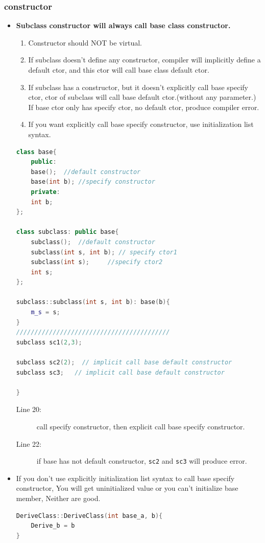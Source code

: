\documentclass[a4paper,11pt,twoside]{book}
\begin{document}
\subsubsection{constructor}
\begin{itemize}
	\item  \textbf{Subclass constructor will always call base class constructor.}
	
	\begin{enumerate}
		\item Constructor should NOT be virtual.
		
		\item If subclass doesn't define any constructor, compiler will implicitly define a default ctor, and this ctor will call base class default ctor.
		
		\item If subclass has a constructor, but it doesn't explicitly call base specify ctor, ctor of subclass will call base default ctor.(without any parameter.) If base ctor only has specify ctor, no default ctor, produce compiler error.
		
		\item If you want explicitly call base specify constructor, use initialization list syntax.
	\end{enumerate}
	
\begin{lstlisting}[frame=single, language=c++]
class base{
	public:
	base();  //default constructor
	base(int b); //specify constructor
	private:
	int b;
};
	
class subclass: public base{
	subclass();  //default constructor
	subclass(int s, int b); // specify ctor1
	subclass(int s);     //specify ctor2
	int s;
};
	
subclass::subclass(int s, int b): base(b){
	m_s = s;
}
//////////////////////////////////////////
subclass sc1(2,3);

subclass sc2(2);  // implicit call base default constructor
subclass sc3;   // implicit call base default constructor

}
\end{lstlisting}
\begin{description}
	\item[Line 20:] call specify constructor, then explicit call base specify constructor.
	\item[Line 22:] if base has not default constructor, \texttt{sc2} and \texttt{sc3} will produce error.
\end{description}
	\item If you don't use  explicitly initialization list syntax to call base specify constructor, You will get uninitialized value or you can't initialize base member, Neither are good.
\begin{lstlisting}[frame=single, language=c++]
DeriveClass::DeriveClass(int base_a, b){
	Derive_b = b
}	


\end{lstlisting}
\end{itemize}
\end{document}
